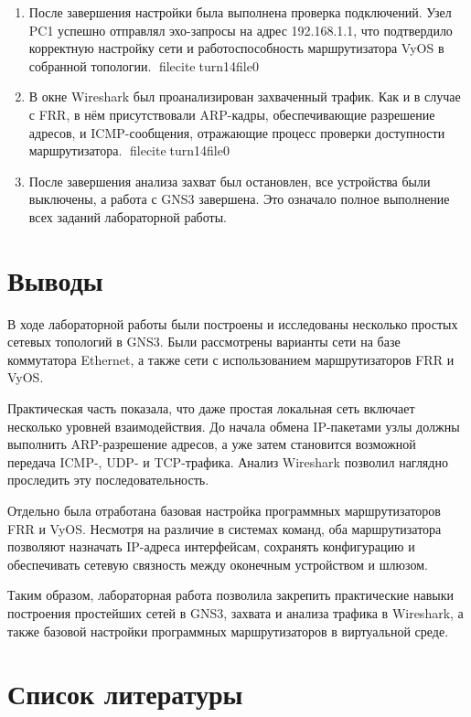 \documentclass[
  english,
  russian,
  12pt,
  a4paper,
  DIV=11,
  numbers=noendperiod]{scrreprt}
\begin{document}
\begin{enumerate}
  интерфейс \texttt{eth0} настроен правильно и доступен для обмена
  трафиком с узлом PC1. fileciteturn14file0
\item
  После завершения настройки была выполнена проверка подключений. Узел
  PC1 успешно отправлял эхо-запросы на адрес 192.168.1.1, что
  подтвердило корректную настройку сети и работоспособность
  маршрутизатора VyOS в собранной топологии. fileciteturn14file0
\item
  В окне Wireshark был проанализирован захваченный трафик. Как и в
  случае с FRR, в нём присутствовали ARP-кадры, обеспечивающие
  разрешение адресов, и ICMP-сообщения, отражающие процесс проверки
  доступности маршрутизатора. fileciteturn14file0
\item
  После завершения анализа захват был остановлен, все устройства были
  выключены, а работа с GNS3 завершена. Это означало полное выполнение
  всех заданий лабораторной работы.
\end{enumerate}

\chapter{Выводы}\label{ux432ux44bux432ux43eux434ux44b}

В ходе лабораторной работы были построены и исследованы несколько
простых сетевых топологий в GNS3. Были рассмотрены варианты сети на базе
коммутатора Ethernet, а также сети с использованием маршрутизаторов FRR
и VyOS.

Практическая часть показала, что даже простая локальная сеть включает
несколько уровней взаимодействия. До начала обмена IP-пакетами узлы
должны выполнить ARP-разрешение адресов, а уже затем становится
возможной передача ICMP-, UDP- и TCP-трафика. Анализ Wireshark позволил
наглядно проследить эту последовательность.

Отдельно была отработана базовая настройка программных маршрутизаторов
FRR и VyOS. Несмотря на различие в системах команд, оба маршрутизатора
позволяют назначать IP-адреса интерфейсам, сохранять конфигурацию и
обеспечивать сетевую связность между оконечным устройством и шлюзом.

Таким образом, лабораторная работа позволила закрепить практические
навыки построения простейших сетей в GNS3, захвата и анализа трафика в
Wireshark, а также базовой настройки программных маршрутизаторов в
виртуальной среде.

\chapter{Список
литературы}\label{ux441ux43fux438ux441ux43eux43a-ux43bux438ux442ux435ux440ux430ux442ux443ux440ux44b}
\end{document}
